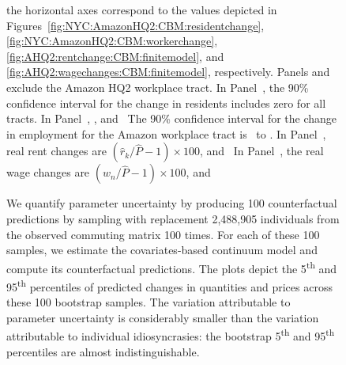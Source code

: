 \documentclass[11pt]{article}
\theoremstyle{definition}
\begin{document}
\begin{figure}[h!]
\begin{center}
\begin{minipage}{0.96\textwidth}
{the horizontal axes correspond to the values depicted in 
Figures~\ref{fig:NYC:AmazonHQ2:CBM:residentchange}, \ref{fig:NYC:AmazonHQ2:CBM:workerchange}, \ref{fig:AHQ2:rentchange:CBM:finitemodel}, and \ref{fig:AHQ2:wagechanges:CBM:finitemodel}, respectively.
Panels  and  exclude the Amazon HQ2 workplace tract.
In Panel~,
the 90\% confidence interval for the change in residents includes zero for all tracts.
In Panel~,
\unskip,
and
\unskip\
The 90\% confidence interval for the change in employment for the Amazon workplace tract is \unskip\ to \unskip.
In Panel~\subref*{fig:fixednu:g_realrent},
real rent changes are $(\hat{r}_{k}/\hat{P} - 1) \times 100$,
and
\unskip\
In Panel~,
the real wage changes are $(\hat{w}_{n}/\hat{P} - 1) \times 100$,
and 

We quantify parameter uncertainty by producing 100 counterfactual predictions by
sampling with replacement 2,488,905 individuals from the observed commuting matrix 100 times.
For each of these 100 samples,
we estimate the covariates-based continuum model and compute its counterfactual predictions.
The plots depict the 5\textsuperscript{th} and 95\textsuperscript{th} percentiles of predicted changes in quantities and prices across these 100 bootstrap samples.
The variation attributable to parameter uncertainty is considerably smaller 
than 
the variation attributable to individual idiosyncrasies:
the bootstrap 5\textsuperscript{th} and 95\textsuperscript{th} percentiles are almost indistinguishable.
\par}
\end{minipage}
\end{center}
\end{figure}
\end{document}
